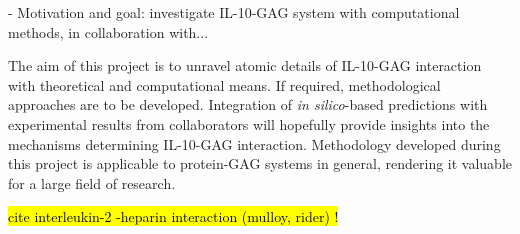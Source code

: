 - Motivation and goal: investigate IL-10-GAG system with computational
      methods, in collaboration with...

The aim of this project is to unravel atomic details of IL-10-GAG interaction
with theoretical and computational means. If required, methodological approaches
are to be developed. Integration of \textit{in silico}-based predictions with
experimental results from collaborators will hopefully provide insights into the
mechanisms determining IL-10-GAG interaction. Methodology developed during this
project is applicable to protein-GAG systems in general, rendering it valuable
for a large field of research.



\hl{cite interleukin-2 -heparin interaction (mulloy, rider) !}

\lipsum[1-5]





